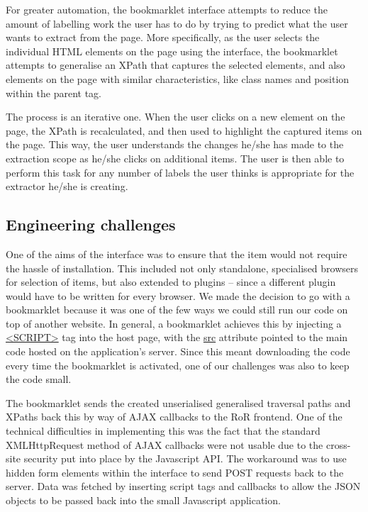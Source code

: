 For greater automation, the bookmarklet interface attempts to reduce the amount of labelling work the user has to do by trying to predict what the user wants to extract from the page. More specifically, as the user selects the individual HTML elements on the page using the interface, the bookmarklet attempts to generalise an XPath that captures the selected elements, and also elements on the page with similar characteristics, like class names and position within the parent tag.


The process is an iterative one. When the user clicks on a new element on the page, the XPath is recalculated, and then used to highlight the captured items on the page. This way, the user understands the changes he/she has made to the extraction scope as he/she clicks on additional items. The user is then able to perform this task for any number of labels the user thinks is appropriate for the extractor he/she is creating.

\subsection{Engineering challenges}

One of the aims of the interface was to ensure that the item would not require the hassle of installation. This included not only standalone, specialised browsers for selection of items, but also extended to plugins -- since a different plugin would have to be written for every browser. We made the decision to go with a bookmarklet because it was one of the few ways we could still run our code on top of another website. In general, a bookmarklet achieves this by injecting a \url{<SCRIPT>} tag into the host page, with the \url{src} attribute pointed to the main code hosted on the application's server. Since this meant downloading the code every time the bookmarklet is activated, one of our challenges was also to keep the code small.

The bookmarklet sends the created unserialised generalised traversal paths and XPaths back this by way of AJAX callbacks to the RoR frontend. One of the technical difficulties in implementing this was the fact that the standard XMLHttpRequest method of AJAX callbacks were not usable due to the cross-site security put into place by the Javascript API. The workaround was to use hidden form elements within the interface to send POST requests back to the server. Data was fetched by inserting script tags and callbacks to allow the JSON objects to be passed back into the small Javascript application.

